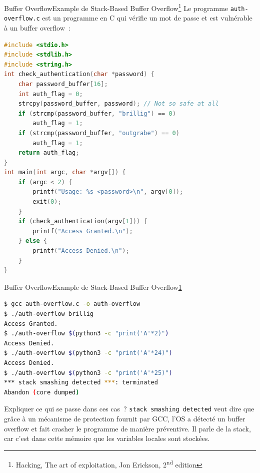\documentclass{beamer}
\begin{document}
    \begin{frame}[fragile]{Buffer Overflow}{Example de Stack-Based Buffer Overflow\footnote{\label{hacking}Hacking, The art of exploitation, Jon Erickson, 2\textsuperscript{nd} edition}}
        Le programme \lstinline{auth-overflow.c} est un programme en C qui vérifie un mot de passe et est vulnérable à un buffer overflow~:
        \begin{lstlisting}[language=C,basicstyle=\tiny\ttfamily]
#include <stdio.h>
#include <stdlib.h>
#include <string.h>
int check_authentication(char *password) {
    char password_buffer[16];
    int auth_flag = 0;
    strcpy(password_buffer, password); // Not so safe at all
    if (strcmp(password_buffer, "brillig") == 0)
        auth_flag = 1;
    if (strcmp(password_buffer, "outgrabe") == 0)
        auth_flag = 1;
    return auth_flag;
}
int main(int argc, char *argv[]) {
    if (argc < 2) {
        printf("Usage: %s <password>\n", argv[0]);
        exit(0);
    }
    if (check_authentication(argv[1])) {
        printf("Access Granted.\n");
    } else {
        printf("Access Denied.\n");
    }
}
        \end{lstlisting}
    \end{frame}

    \begin{frame}[fragile]{Buffer Overflow}{Example de Stack-Based Buffer Overflow\cref{hacking}}
        \begin{lstlisting}[language=bash]
$ gcc auth-overflow.c -o auth-overflow
$ ./auth-overflow brillig
Access Granted.
$ ./auth-overflow $(python3 -c "print('A'*2)")
Access Denied.
$ ./auth-overflow $(python3 -c "print('A'*24)")
Access Denied.
$ ./auth-overflow $(python3 -c "print('A'*25)")
*** stack smashing detected ***: terminated
Abandon (core dumped)
        \end{lstlisting}
        Expliquer ce qui se passe dans ces cas~?
        \pause
        \bigbreak
        \lstinline{stack smashing detected} veut dire que grâce à un mécanisme de protection fournit par GCC, l'OS a détecté un buffer overflow et fait crasher le programme de manière préventive.
        Il parle de la stack, car c'est dans cette mémoire que les variables locales sont stockées.
    \end{frame}
\end{document}
